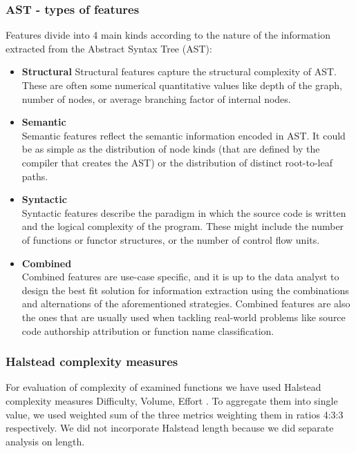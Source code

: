 \documentclass[conference]{IEEEtran}
\begin{document}
\subsubsection{AST - types of features}

Features divide into 4 main kinds according to the nature of the information extracted from the Abstract Syntax Tree (AST):
\begin{itemize}
    \item \textbf{Structural} \label{item:structural}
    Structural features capture the structural complexity of AST. These are often some numerical quantitative values like depth of the graph, number of nodes, or average branching factor of internal nodes.
    \item \textbf{Semantic} \\
    Semantic features reflect the semantic information encoded in AST. It could be as simple as the distribution of node kinds (that are defined by the compiler that creates the AST) or the distribution of distinct root-to-leaf paths.
    \item \textbf{Syntactic} \\
    Syntactic features describe the paradigm in which the source code is written and the logical complexity of the program. These might include the number of functions or functor structures, or the number of control flow units.
    \item \textbf{Combined} \\
    Combined features are use-case specific, and it is up to the data analyst to design the best fit solution for information extraction using the combinations and alternations of the aforementioned strategies. Combined features are also the ones that are usually used when tackling real-world problems like source code authorship attribution or function name classification.  
\end{itemize}


\subsubsection{Halstead complexity measures}

For evaluation of complexity of examined functions we have used Halstead complexity 
measures Difficulty, Volume, Effort \cite{halstead}. To aggregate them into single value, 
we used weighted sum of the three metrics weighting them in ratios 4:3:3 respectively. 
We did not incorporate Halstead length because we did separate analysis on length.
\end{document}
